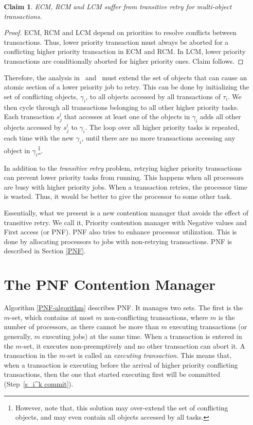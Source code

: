 \documentclass[a4paper,english]{article}
\newtheorem{clm}{Claim}
\newtheorem{proof}{Proof}
\begin{document}
\begin{clm}\label{ecm-rcm-transitive-retry}
ECM, RCM and LCM suffer from transitive retry for multi-object transactions.
\end{clm}
\begin{proof}\normalfont
ECM, RCM and LCM depend on priorities to resolve conflicts between transactions. Thus, lower priority transaction must always be aborted for a conflicting higher priority transaction in ECM and RCM. In LCM, lower priority transactions are conditionally aborted for higher priority ones. Claim follows. 
\end{proof}

Therefore, the analysis in~\cite{stmconcurrencycontrol:emsoft11} and~\cite{lcmdac2012} must extend the set of objects that can cause an atomic section of a lower priority job to retry.  This can be done by initializing the set of conflicting objects, $\gamma_i$, to all objects accessed by all transactions of $\tau_i$. We then cycle through all transactions belonging to all other higher priority tasks. Each transaction $s_j^l$ that accesses at least one of the objects in $\gamma_i$ adds all other objects accessed by $s_j^l$ to $\gamma_i$. The loop over all higher priority tasks is repeated, each time with the new $\gamma_i$, until there are no more transactions accessing any object in $\gamma_i$\footnote{However, note that, this solution may over-extend the set of conflicting objects, and may even contain all objects accessed by all tasks.}.

In addition to the \emph{transitive retry} problem, retrying higher priority transactions can prevent lower priority tasks from running. This happens when all processors are busy with higher priority jobs. When a transaction retries, the processor time is wasted. Thus, it would be better to give the processor to some other task.


Essentially, what we present is a new contention manager that avoids the effect of transitive retry. We call it, Priority contention manager with Negative values and First access (or PNF). PNF also tries to enhance processor utilization. This is done by allocating processors to jobs with non-retrying transactions. PNF is described in Section \ref{PNF}.

\section{The PNF Contention Manager\label{PNF}}

Algorithm \ref{PNF-algorithm} describes PNF. It
manages two sets. The first is the $m$-set, which contains at most $m$ non-conflicting
transactions, where $m$ is the number of processors, as
there cannot be more than $m$ executing transactions (or generally,
$m$ executing jobs) at the same time. When a transaction is entered
in the $m$-set, it executes non-preemptively and no other transaction
can abort it. A transaction in the $m$-set is called an \emph{executing
transaction}. 
This means that, when a transaction is executing before
the arrival of higher priority conflicting transactions, then the
one that started executing first will be committed (Step~\ref{s_i^k commit}). 
\end{document}
